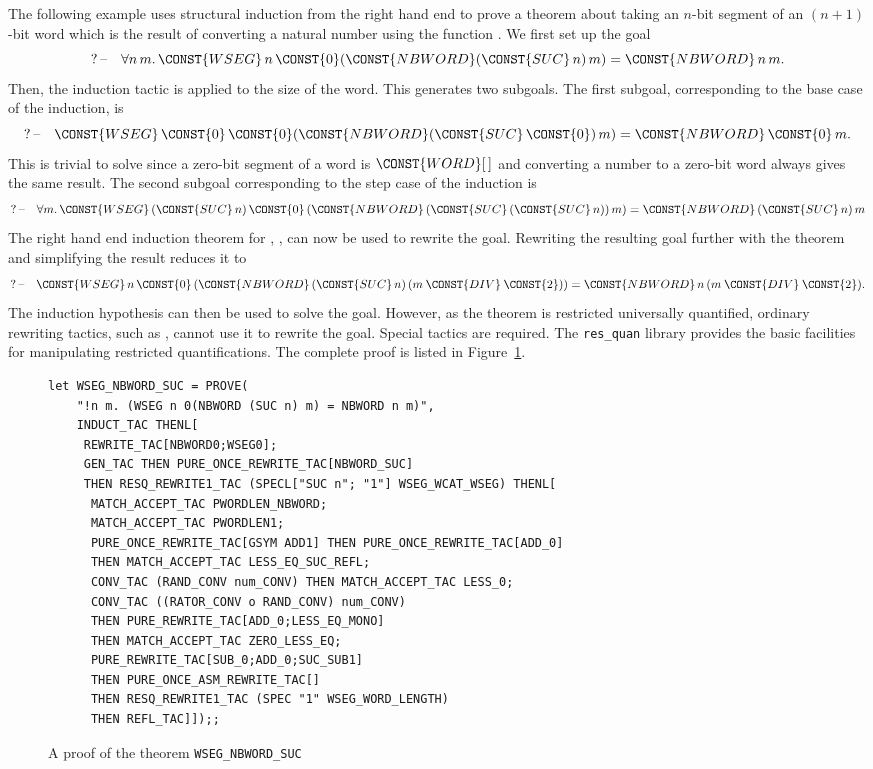 The following example uses structural induction from the right hand
end to prove a theorem about taking an $n$-bit segment of an
$(n + 1)$-bit word which is the result of converting a natural number
using the function . We first set up the goal
\[
\GOAL \FORALL n\,m\DOT \CONST{WSEG}\,n\,\CONST{0}(\CONST{NBWORD}(\CONST{SUC}\,n)\,m)
= \CONST{NBWORD}\,n\,m.
\]
Then, the induction tactic  is applied to the size
of the word. This generates two subgoals. The first subgoal,
corresponding to the base case of the induction, is
\[
\GOAL \CONST{WSEG}\,\CONST{0}\,\CONST{0}(\CONST{NBWORD}(\CONST{SUC}\,\CONST{0})\,m)
= \CONST{NBWORD}\,\CONST{0}\,m.
\]
This is trivial to solve since a zero-bit segment of a word is
$\CONST{WORD}[\,]$ and converting a number to a zero-bit word always
gives the same result.
The second subgoal corresponding to the step case of the induction is
\[
\GOAL \FORALL m\DOT
    \CONST{WSEG} \,(\CONST{SUC} \,n) \,\CONST{0}
       \,(\CONST{NBWORD} \,(\CONST{SUC} \,(\CONST{SUC} \,n)) \,m) =
       \CONST{NBWORD} \,(\CONST{SUC} \,n) \,m
\]
The right hand end induction theorem for ,
, can now be used to rewrite the goal. 
Rewriting the resulting goal further with the theorem
 and simplifying the result reduces it to
\[
\GOAL\CONST{WSEG} \,n \,\CONST{0} \,(\CONST{NBWORD} \,(\CONST{SUC} \,n)
                                   \,(m \:\CONST{DIV}\: \CONST{2})) =
    \CONST{NBWORD} \,n \,(m \:\CONST{DIV}\: \CONST{2}).
\]
The induction hypothesis can then be used to solve the goal. However,
as the theorem  is restricted universally
quantified, ordinary rewriting tactics, such as ,
cannot use it to rewrite the goal. Special tactics are required. The
{\tt res\_quan} library provides the basic facilities for manipulating
restricted quantifications\cite{WW:res_quan-manual}.
The complete proof is listed in Figure~\ref{fig-WSEG_NBWORD_SUC}.
\begin{figure}
\begin{center}\small
\makeatletter
\def\verbatim@font{\small\tt}
\makeatother
\begin{verbatim}
let WSEG_NBWORD_SUC = PROVE(
    "!n m. (WSEG n 0(NBWORD (SUC n) m) = NBWORD n m)",
    INDUCT_TAC THENL[
     REWRITE_TAC[NBWORD0;WSEG0];
     GEN_TAC THEN PURE_ONCE_REWRITE_TAC[NBWORD_SUC]
     THEN RESQ_REWRITE1_TAC (SPECL["SUC n"; "1"] WSEG_WCAT_WSEG) THENL[
      MATCH_ACCEPT_TAC PWORDLEN_NBWORD;
      MATCH_ACCEPT_TAC PWORDLEN1;
      PURE_ONCE_REWRITE_TAC[GSYM ADD1] THEN PURE_ONCE_REWRITE_TAC[ADD_0]
      THEN MATCH_ACCEPT_TAC LESS_EQ_SUC_REFL;
      CONV_TAC (RAND_CONV num_CONV) THEN MATCH_ACCEPT_TAC LESS_0;
      CONV_TAC ((RATOR_CONV o RAND_CONV) num_CONV)
      THEN PURE_REWRITE_TAC[ADD_0;LESS_EQ_MONO]
      THEN MATCH_ACCEPT_TAC ZERO_LESS_EQ;
      PURE_REWRITE_TAC[SUB_0;ADD_0;SUC_SUB1]
      THEN PURE_ONCE_ASM_REWRITE_TAC[]
      THEN RESQ_REWRITE1_TAC (SPEC "1" WSEG_WORD_LENGTH)
      THEN REFL_TAC]]);;
\end{verbatim}
\end{center}
\caption{A proof of the theorem {\tt WSEG\_NBWORD\_SUC}\label{fig-WSEG_NBWORD_SUC}}
\end{figure}

